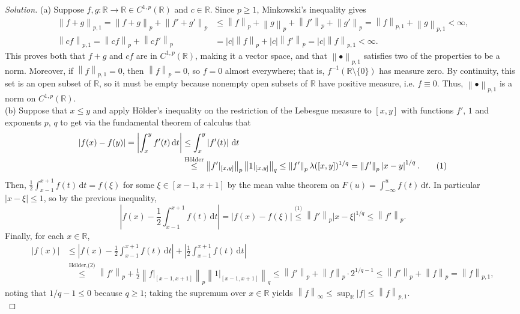 \documentclass[10pt]{article}
\newcommand{\dd}{\,\mathrm{d}}
\providecommand{\half}{\frac{1}{2}}
\providecommand{\RR}{\mathbb R}
\providecommand{\inv}{^{-1}}
\newenvironment{soln}{\begin{proof}[Solution]}{\end{proof}}
\providecommand{\abs}[1]{\left\lvert #1\right\rvert}
\providecommand{\norm}[1]{\left\| #1\right\|}
\begin{document}
\begin{soln}
    (a) Suppose $f,g\colon\RR\to\RR\in C^{1,p}(\RR)$ and $c\in\RR$.
    Since $p\ge 1$, Minkowski's inequality gives
    \begin{align*}
	\norm{f+g}_{p,1} = \norm{f+g}_p + \norm{f'+g'}_p
	&\le \norm{f}_p + \norm{g}_p + \norm{f'}_p + \norm{g'}_p
	= \norm{f}_{p,1} + \norm{g}_{p,1} < \infty,\\
	\norm{cf}_{p,1} = \norm{cf}_p + \norm{cf'}_p
	&= \abs{c}\norm{f}_p + \abs{c}\norm{f'}_p = \abs{c}\norm{f}_{p,1}
	< \infty.
    \end{align*}
    This proves both that $f+g$ and $cf$ are in $C^{1,p}(\RR)$,
    making it a vector space, and that $\norm{\bullet}_{p,1}$
    satisfies two of the properties to be a norm.
    Moreover, if $\norm{f}_{p,1} = 0$, then $\norm{f}_p = 0$,
    so $f = 0$ almost everywhere;
    that is, $f\inv(\RR\setminus\{0\})$ has measure zero.
    By continuity, this set is an open subset of $\RR$, so it must be empty
    because nonempty open subsets of $\RR$ have positive measure,
    i.e. $f\equiv 0$.
    Thus, $\norm{\bullet}_{p,1}$ is a norm on $C^{1,p}(\RR)$.
    \\

    (b) Suppose that $x \le y$ and apply H\"older's inequality
    on the restriction of the Lebesgue measure to $[x,y]$
    with functions $f'$, $1$ and exponents $p$, $q$ to get
    via the fundamental theorem of calculus that
    \begin{align*}
	\abs{f(x) - f(y)} = \abs{\int_x^y f'(t)\dd t}
	&\le \int_x^y \abs{f'(t)}\dd t\\
	&\overset{\text{H\"older}}\le \norm{f'|_{[x,y]}}_p\norm{1|_{[x,y]}}_q
	\le \norm{f'}_p\lambda([x,y])^{1/q}
	= \norm{f'}_p\abs{x-y}^{1/q}.\stepcounter{equation}\tag{\theequation}
    \end{align*}
    Then, $\half\int_{x-1}^{x+1}f(t)\dd t = f(\xi)$
    for some $\xi\in[x-1,x+1]$ by the mean value theorem
    on $F(u) = \int_{-\infty}^u f(t)\dd t$.
    In particular $\abs{x - \xi} \le 1$, so by the previous inequality,
    \begin{equation}
	\abs{f(x) - \half\int_{x-1}^{x+1}f(t)\dd t}
	= \abs{f(x) - f(\xi)} \overset{\text{(1)}}\le
	\norm{f'}_p\abs{x-\xi}^{1/q} \le \norm{f'}_p.
    \end{equation}
    Finally, for each $x\in\RR$,
    \begin{align*}
	\abs{f(x)}
	&\le \abs{f(x) - \half\int_{x-1}^{x+1}f(t)\dd t}
	+ \abs{\half\int_{x-1}^{x+1}f(t)\dd t}\\
	&\overset{\text{H\"older,(2)}}\le
	\norm{f'}_p + \half\norm{f|_{[x-1,x+1]}}_p\norm{1|_{[x-1,x+1]}}_q
	\le \norm{f'}_p + \norm{f}_p\cdot 2^{1/q-1}
	\le \norm{f'}_p + \norm{f}_p = \norm{f}_{p,1},
    \end{align*}
    noting that $1/q - 1 \le 0$ because $q\ge 1$;
    taking the supremum over $x\in\RR$
    yields $\norm{f}_\infty \le \sup_\RR\abs f \le \norm{f}_{p,1}$.\\


\end{soln}
\end{document}

